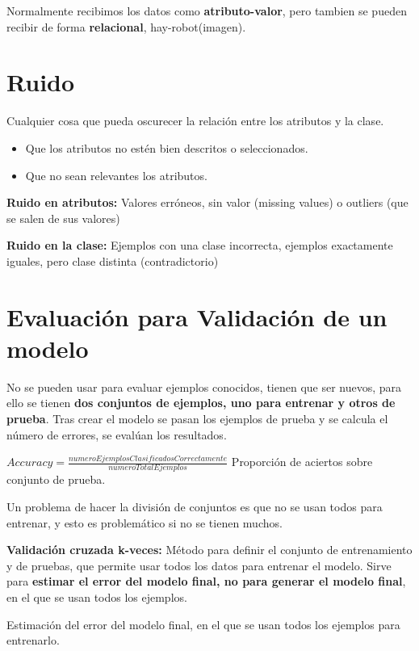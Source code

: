 \documentclass[12pt]{report} %
\begin{document}
Normalmente recibimos los datos como \textbf{atributo-valor}, pero 
tambien se pueden recibir de forma \textbf{relacional}, hay-robot(imagen).

\section{Ruido}

Cualquier cosa que pueda oscurecer la relación entre los atributos y la
clase.

\begin{itemize}

\item
  Que los atributos no estén bien descritos o seleccionados.
\item
  Que no sean relevantes los atributos.
\end{itemize}

\textbf{Ruido en atributos:} Valores erróneos, sin valor (missing
values) o outliers (que se salen de sus valores)

\textbf{Ruido en la clase:} Ejemplos con una clase incorrecta, ejemplos
exactamente iguales, pero clase distinta (contradictorio)

\section{Evaluación para Validación de un
modelo}

No se pueden usar para evaluar ejemplos conocidos, tienen que ser
nuevos, para ello se tienen \textbf{dos conjuntos de ejemplos, uno para
entrenar y otros de prueba}. Tras crear el modelo se pasan los ejemplos
de prueba y se calcula el número de errores, se evalúan los resultados.

\(Accuracy= \frac {numeroEjemplosClasificadosCorrectamente}{numeroTotalEjemplos}\)
Proporción de aciertos sobre conjunto de prueba.

Un problema de hacer la división de conjuntos es que no se usan todos
para entrenar, y esto es problemático si no se tienen muchos.

\textbf{Validación cruzada k-veces:} Método para definir el conjunto de
entrenamiento y de pruebas, que permite usar todos los datos para
entrenar el modelo. Sirve para \textbf{estimar el error del modelo
final, no para generar el modelo final}, en el que se usan todos los
ejemplos.

Estimación del error del modelo final, en el que se usan todos los
ejemplos para entrenarlo.
\end{document}
